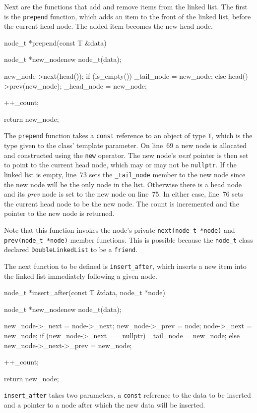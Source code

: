 \documentclass{article}
\begin{document}
  Next are the functions that add and remove items from the linked list.
  The first is the \verb|prepend| function, which adds an item to the front of the linked list, before the current head node. The added item becomes the new head node.
  \begin{lstcpp}
  node_t *prepend(const T &data) {
    node_t *new_node{new node_t(data)};

    new_node->next(head());
    if (is_empty())
        _tail_node = new_node;
    else
        head()->prev(new_node);
    _head_node = new_node;

    ++_count;

    return new_node;
  }\end{lstcpp}
  The \verb|prepend| function takes a \verb|const| reference to an object of type \verb|T|, which is the type given to the class' template parameter. On line~69 a new node is allocated and constructed using the \verb|new| operator. The new node's \emph{next} pointer is then set to point to the current head node, which may or may not be \verb|nullptr|. If the linked list is empty, line~73 sets the \verb|_tail_node| member to the new node since the new node will be the only node in the list. Otherwise there is a head node and its \emph{prev} node is set to the new node on line~75. In either case, line~76 sets the current head node to be the new node. The count is incremented and the pointer to the new node is returned.

  Note that this function invokes the node's private \verb|next(node_t *node)| and \verb|prev(node_t *node)| member functions. This is possible because the \verb|node_t| class declared \verb|DoubleLinkedList| to be a \verb|friend|.

  The next function to be defined is \verb|insert_after|, which inserts a new item into the linked list immediately following a given node.
  \begin{lstcpp}
  node_t *insert_after(const T &data, node_t *node) {
    node_t *new_node{new node_t(data)};

    new_node->_next = node->_next;
    new_node->_prev = node;
    node->_next = new_node;
    if (new_node->_next == nullptr)
      _tail_node = new_node;
    else
      new_node->_next->_prev = new_node;

    ++_count;

    return new_node;
  }\end{lstcpp}
  \verb|insert_after| takes two parameters, a \verb|const| reference to the data to be inserted and a pointer to a node after which the new data will be inserted.
\end{document}
